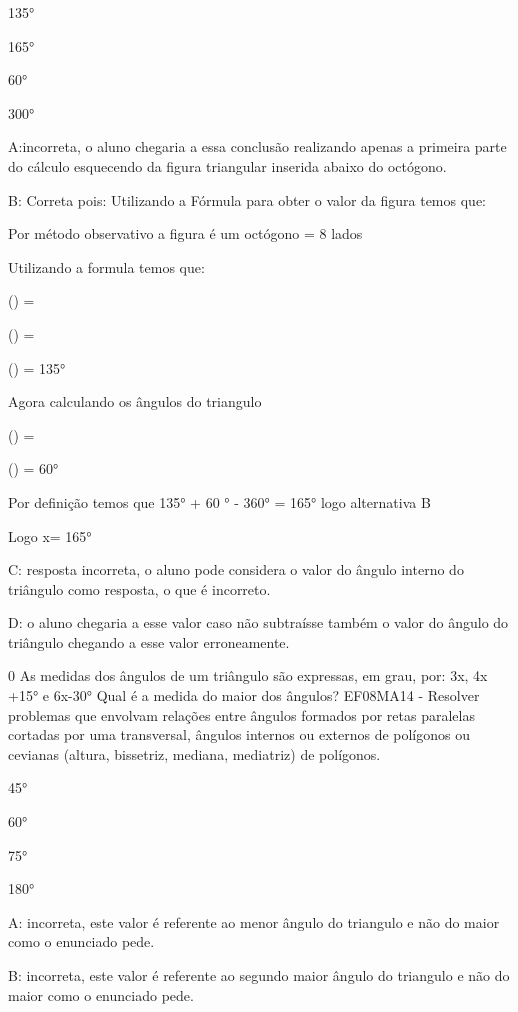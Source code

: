 \item 135°
\item 165°
\item 60°
\item 300°

A:incorreta, o aluno chegaria a essa conclusão realizando apenas a
primeira parte do cálculo esquecendo da figura triangular inserida
abaixo do octógono.

B: Correta pois: Utilizando a Fórmula para obter o valor da figura temos
que:

Por método observativo a figura é um octógono = 8 lados

Utilizando a formula temos que:

() =

() =

() = 135°

Agora calculando os ângulos do triangulo

() =

() = 60°

Por definição temos que 135° + 60 ° - 360° = 165° logo alternativa B

Logo x= 165°

C: resposta incorreta, o aluno pode considera o valor do ângulo interno
do triângulo como resposta, o que é incorreto.

D: o aluno chegaria a esse valor caso não subtraísse também o valor do
ângulo do triângulo chegando a esse valor erroneamente.

\num{0} As medidas dos ângulos de um triângulo são expressas, em grau, por:
3x, 4x +15° e 6x-30° Qual é a medida do maior dos ângulos? EF08MA14 -
Resolver problemas que envolvam relações entre ângulos formados por
retas paralelas cortadas por uma transversal, ângulos internos ou
externos de polígonos ou cevianas (altura, bissetriz, mediana,
mediatriz) de polígonos.

\item 45°
\item 60°
\item 75°
\item 180°

A: incorreta, este valor é referente ao menor ângulo do triangulo e não
do maior como o enunciado pede.

B: incorreta, este valor é referente ao segundo maior ângulo do
triangulo e não do maior como o enunciado pede.

